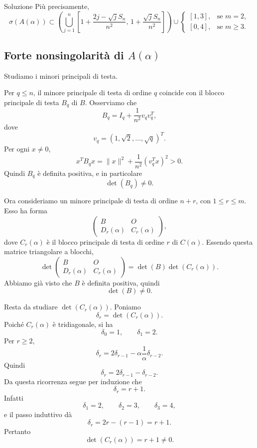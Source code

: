 \documentclass[a4paper]{article}
\begin{document}
\begin{snippetsolution}{Soluzione}
    Più precisamente,
    \[
        \boxed{
            \sigma(A(\alpha))
            \subset
            \left(\bigcup_{j=1}^n
                \left[
                    1+\frac{2j-\sqrt{j}S_n}{n^2},
                    \,
                    1+\frac{\sqrt{j}S_n}{n^2}
            \right]\right)
            \cup
            \begin{cases}
                [1,3], & \text{se } m=2,\\[2pt]
                [0,4], & \text{se } m\geq 3.
            \end{cases}
        }
    \]

    \subsection*{Forte nonsingolarità di \(A(\alpha)\)}

    Studiamo i minori principali di testa.

    Per \(q\leq n\), il minore principale di testa di ordine \(q\) coincide con il blocco principale di testa \(B_q\) di \(B\). Osserviamo che
    \[
        B_q=I_q+\frac{1}{n^2}v_qv_q^T,
    \]
    dove
    \[
        v_q=(1,\sqrt{2},\dots,\sqrt{q})^T.
    \]
    Per ogni \(x\neq 0\),
    \[
        x^TB_qx
        =
        \|x\|^2+\frac{1}{n^2}(v_q^Tx)^2>0.
    \]
    Quindi \(B_q\) è definita positiva, e in particolare
    \[
        \det(B_q)\neq 0.
    \]

    Ora consideriamo un minore principale di testa di ordine \(n+r\), con \(1\leq r\leq m\). Esso ha forma
    \[
        \begin{pmatrix}
            B & O\\
            D_r(\alpha) & C_r(\alpha)
        \end{pmatrix},
    \]
    dove \(C_r(\alpha)\) è il blocco principale di testa di ordine \(r\) di \(C(\alpha)\). Essendo questa matrice triangolare a blocchi,
    \[
        \det
        \begin{pmatrix}
            B & O\\
            D_r(\alpha) & C_r(\alpha)
        \end{pmatrix}
        =
        \det(B)\det(C_r(\alpha)).
    \]
    Abbiamo già visto che \(B\) è definita positiva, quindi
    \[
        \det(B)\neq 0.
    \]

    Resta da studiare \(\det(C_r(\alpha))\). Poniamo
    \[
        \delta_r=\det(C_r(\alpha)).
    \]
    Poiché \(C_r(\alpha)\) è tridiagonale, si ha
    \[
        \delta_0=1,
        \qquad
        \delta_1=2.
    \]
    Per \(r\geq 2\),
    \[
        \delta_r
        =
        2\delta_{r-1}
        -
        \alpha\frac{1}{\alpha}\delta_{r-2}.
    \]
    Quindi
    \[
        \delta_r=2\delta_{r-1}-\delta_{r-2}.
    \]
    Da questa ricorrenza segue per induzione che
    \[
        \delta_r=r+1.
    \]
    Infatti
    \[
        \delta_1=2,
        \qquad
        \delta_2=3,
        \qquad
        \delta_3=4,
    \]
    e il passo induttivo dà
    \[
        \delta_r=2r-(r-1)=r+1.
    \]
    Pertanto
    \[
        \det(C_r(\alpha))=r+1\neq 0.
    \]


\end{snippetsolution}
\end{document}
